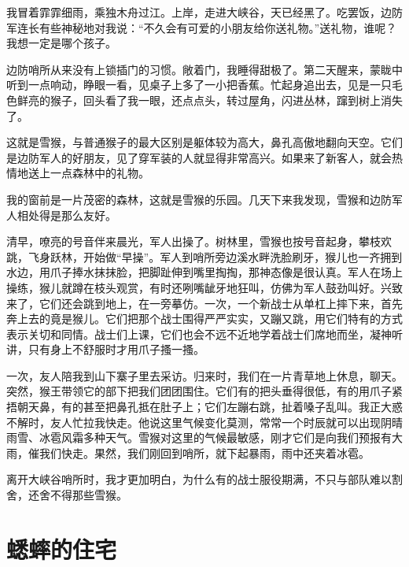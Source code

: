 \documentclass[12pt,UTF-8,openany]{ctexbook}
\begin{document}
\begin{large}
    
    我冒着霏霏细雨，乘独木舟过江。上岸，走进大峡谷，天已经黑了。吃罢饭，边防军连长有些神秘地对我说：“不久会有可爱的小朋友给你送礼物。”送礼物，谁呢？我想一定是哪个孩子。
    
    边防哨所从来没有上锁插门的习惯。敞着门，我睡得甜极了。第二天醒来，蒙眬中听到一点响动，睁眼一看，见桌子上多了一小把香蕉。忙起身追出去，见是一只毛色鲜亮的猴子，回头看了我一眼，还点点头，转过屋角，闪进丛林，蹿到树上消失了。
    
    这就是雪猴，与普通猴子的最大区别是躯体较为高大，鼻孔高傲地翻向天空。它们是边防军人的好朋友，见了穿军装的人就显得非常高兴。如果来了新客人，就会热情地送上一点森林中的礼物。
    
    我的窗前是一片茂密的森林，这就是雪猴的乐园。几天下来我发现，雪猴和边防军人相处得是那么友好。
    
    清早，嘹亮的号音伴来晨光，军人出操了。树林里，雪猴也按号音起身，攀枝欢跳，飞身跃林，开始做“早操”。军人到哨所旁边溪水畔洗脸刷牙，猴儿也一齐拥到水边，用爪子捧水抹抹脸，把脚趾伸到嘴里掏掏，那神态像是很认真。军人在场上操练，猴儿就蹲在枝头观赏，有时还咧嘴龇牙地狂叫，仿佛为军人鼓劲叫好。兴致来了，它们还会跳到地上，在一旁摹仿。一次，一个新战士从单杠上摔下来，首先奔上去的竟是猴儿。它们把那个战士围得严严实实，又蹦又跳，用它们特有的方式表示关切和同情。战士们上课，它们也会不远不近地学着战士们席地而坐，凝神听讲，只有身上不舒服时才用爪子搔一搔。
    
    一次，友人陪我到山下寨子里去采访。归来时，我们在一片青草地上休息，聊天。突然，猴王带领它的部下把我们团团围住。它们有的把头垂得很低，有的用爪子紧捂朝天鼻，有的甚至把鼻孔抵在肚子上；它们左蹦右跳，扯着嗓子乱叫。我正大惑不解时，友人忙拉我快走。他说这里气候变化莫测，常常一个时辰就可以出现阴晴雨雪、冰雹风霜多种天气。雪猴对这里的气候最敏感，刚才它们是向我们预报有大雨，催我们快走。果然，我们刚回到哨所，就下起暴雨，雨中还夹着冰雹。
    
    离开大峡谷哨所时，我才更加明白，为什么有的战士服役期满，不只与部队难以割舍，还舍不得那些雪猴。
    
\end{large}



\chapter{蟋蟀的住宅}
\end{document}
